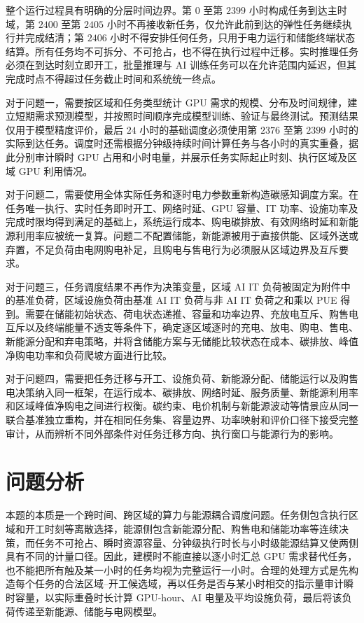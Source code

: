 \documentclass[withoutpreface,bwprint]{cumcmthesis}
\begin{document}
整个运行过程具有明确的分层时间边界。第 $0$ 至第 $2399$ 小时构成任务到达主时域，第 $2400$ 至第 $2405$ 小时不再接收新任务，仅允许此前到达的弹性任务继续执行并完成结清；第 $2406$ 小时不得安排任何任务，只用于电力运行和储能终端状态结算。所有任务均不可拆分、不可抢占，也不得在执行过程中迁移。实时推理任务必须在到达时刻立即开工，批量推理与 AI 训练任务可以在允许范围内延迟，但其完成时点不得超过任务截止时间和系统统一终点。

对于问题一，需要按区域和任务类型统计 GPU 需求的规模、分布及时间规律，建立短期需求预测模型，并按照时间顺序完成模型训练、验证与最终测试。预测结果仅用于模型精度评价，最后 $24$ 小时的基础调度必须使用第 $2376$ 至第 $2399$ 小时的实际到达任务。调度时还需根据分钟级持续时间计算任务与各小时的真实重叠，据此分别审计瞬时 GPU 占用和小时电量，并展示任务实际起止时刻、执行区域及区域 GPU 利用情况。

对于问题二，需要使用全体实际任务和逐时电力参数重新构造碳感知调度方案。在任务唯一执行、实时任务即时开工、网络时延、GPU 容量、IT 功率、设施功率及完成时限均得到满足的基础上，系统运行成本、购电碳排放、有效网络时延和新能源利用率应被统一复算。问题二不配置储能，新能源被用于直接供能、区域外送或弃置，不足负荷由电网购电补足，且购电与售电行为必须服从区域边界及互斥要求。

对于问题三，任务调度结果不再作为决策变量，区域 AI IT 负荷被固定为附件中的基准负荷，区域设施负荷由基准 AI IT 负荷与非 AI IT 负荷之和乘以 PUE 得到。需要在储能初始状态、荷电状态递推、容量和功率边界、充放电互斥、购售电互斥以及终端能量不透支等条件下，确定逐区域逐时的充电、放电、购电、售电、新能源分配和弃电策略，并将含储能方案与无储能比较状态在成本、碳排放、峰值净购电功率和负荷爬坡方面进行比较。

对于问题四，需要把任务迁移与开工、设施负荷、新能源分配、储能运行以及购售电决策纳入同一框架，在运行成本、碳排放、网络时延、服务质量、新能源利用率和区域峰值净购电之间进行权衡。碳约束、电价机制与新能源波动等情景应从同一联合基准独立重构，并在相同任务集、容量边界、功率映射和评价口径下接受完整审计，从而辨析不同外部条件对任务迁移方向、执行窗口与能源行为的影响。

\section{问题分析}

本题的本质是一个跨时间、跨区域的算力与能源耦合调度问题。任务侧包含执行区域和开工时刻等离散选择，能源侧包含新能源分配、购售电和储能功率等连续决策，而任务不可抢占、瞬时资源容量、分钟级执行时长与小时级能源结算又使两侧具有不同的计量口径。因此，建模时不能直接以逐小时汇总 GPU 需求替代任务，也不能把所有触及某一小时的任务均视为完整运行一小时。合理的处理方式是先构造每个任务的合法区域--开工候选域，再以任务是否与某小时相交的指示量审计瞬时容量，以实际重叠时长计算 GPU-hour、AI 电量及平均设施负荷，最后将该负荷传递至新能源、储能与电网模型。
\end{document}
